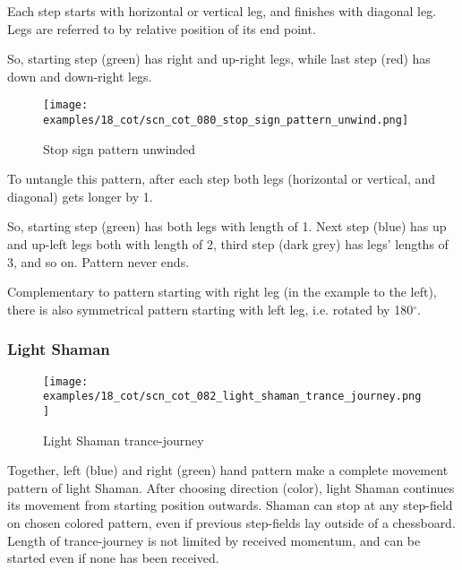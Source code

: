 Each step starts with horizontal or vertical leg, and finishes with diagonal
leg. Legs are referred to by relative position of its end point.

So, starting step (green) has right and up-right legs, while last step (red)
has down and down-right legs.

\clearpage %

\noindent
\begin{wrapfigure}{l}{0.4\textwidth} %
\centering
\texttt{[image: examples/18\_cot/scn\_cot\_080\_stop\_sign\_pattern\_unwind.png]}
\caption{Stop sign pattern unwinded}
\label{fig:scn_cot_080_stop_sign_pattern_unwind}
\end{wrapfigure}
To untangle this pattern, after each step both legs (horizontal or vertical,
and diagonal) gets longer by 1.

So, starting step (green) has both legs with length of 1. Next step (blue)
has up and up-left legs both with length of 2, third step (dark grey) has
legs' lengths of 3, and so on. Pattern never ends.

Complementary to pattern starting with right leg (in the example to the
left), there is also symmetrical pattern starting with left leg, i.e.
rotated by 180$^{\circ}$. %

\clearpage %

\subsubsection*{Light Shaman}
\label{sec:Conquest of Tlalocan/Trance-journey/Movement/Light Shaman}

\vspace*{-1.4\baselineskip}
\noindent
\begin{figure}[!h]
\texttt{[image: examples/18\_cot/scn\_cot\_082\_light\_shaman\_trance\_journey.png]}
\vspace*{-1.3\baselineskip}
\caption{Light Shaman trance-journey}
\label{fig:scn_cot_082_light_shaman_trance_journey}
\end{figure}

\vspace*{-0.5\baselineskip}
Together, left (blue) and right (green) hand pattern make a complete movement
pattern of light Shaman. After choosing direction (color), light Shaman
continues its movement from starting position outwards. Shaman can stop at
any step-field on chosen colored pattern, even if previous step-fields lay
outside of a chessboard. Length of trance-journey is not limited by received
momentum, and can be started even if none has been received.

